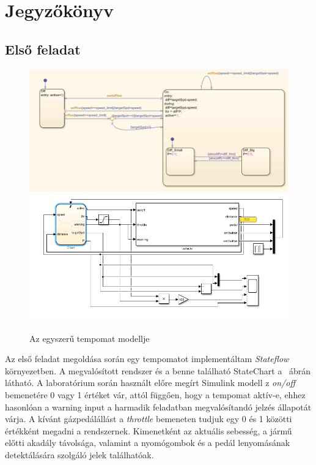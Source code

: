 \chapter{Jegyzőkönyv}

\section{Első feladat}
\begin{figure}[!ht]
	\centering
	\includegraphics[width=120mm,keepaspectratio]{figures/2m04/f2_chart_2.png}
	\includegraphics[width=120mm,keepaspectratio]{figures/2m04/f2_model_2.png}
	\caption{Az egyszerű tempomat modellje}
	\label{fig:chart1}
\end{figure}
Az első feladat megoldása során egy tempomatot implementáltam \textit{Stateflow} környezetben. A megvalósított rendszer és a benne található StateChart a ~ábrán látható. A laboratórium során használt előre megírt Simulink modell z \textit{on/off} bemenetére 0 vagy 1 értéket vár, attól függően, hogy a tempomat aktív-e, ehhez hasonlóan a warning input a harmadik feladatban megvalósítandó jelzés állapotát várja. A kívánt gázpedálállást a \textit{throttle} bemeneten tudjuk egy 0 és 1 közötti értékként megadni a rendszernek. Kimenetként az aktuális sebesség, a jármű előtti akadály távolsága, valamint a nyomógombok és a pedál lenyomásának detektálására szolgáló jelek találhatóak.



